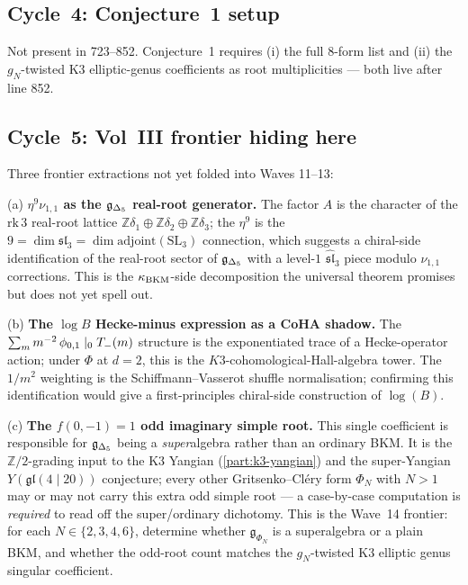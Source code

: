 \subsection*{Cycle~4: Conjecture~1 setup}

Not present in 723--852. Conjecture~1 requires (i) the full 8-form list
and (ii) the $g_N$-twisted K3 elliptic-genus coefficients as root
multiplicities --- both live after line 852.

\subsection*{Cycle~5: Vol~III frontier hiding here}

Three frontier extractions not yet folded into Waves 11--13:

(a) \textbf{$\eta^9 \nu_{1,1}$ as the $\mathfrak{g}_{\Delta_5}$ real-root generator.} The
factor $A$ is the character of the $\mathrm{rk}\,3$ real-root lattice
$\mathbb{Z}\delta_1 \oplus \mathbb{Z}\delta_2 \oplus \mathbb{Z}\delta_3$;
the $\eta^9$ is the $9 = \dim \mathfrak{sl}_3 = \dim \mathrm{adjoint}(\mathrm{SL}_3)$
connection, which suggests a chiral-side identification of the real-root
sector of $\mathfrak{g}_{\Delta_5}$ with a level-$1$ $\widehat{\mathfrak{sl}}_3$ piece modulo
$\nu_{1,1}$ corrections. This is the $\kappa_{\mathrm{BKM}}$-side decomposition the
universal theorem promises but does not yet spell out.

(b) \textbf{The $\log B$ Hecke-minus expression as a CoHA shadow.} The
$\sum_m m^{-2}\,\phi_{0,1} \mid_0 T_-(m)$ structure is the exponentiated
trace of a Hecke-operator action; under $\Phi$ at $d = 2$, this is the
$K3$-cohomological-Hall-algebra tower. The $1/m^2$ weighting is the
Schiffmann--Vasserot shuffle normalisation; confirming this
identification would give a first-principles chiral-side construction
of $\log(B)$.

(c) \textbf{The $f(0, -1) = 1$ odd imaginary simple root.} This single
coefficient is responsible for $\mathfrak{g}_{\Delta_5}$ being a \emph{super}algebra
rather than an ordinary BKM. It is the $\mathbb{Z}/2$-grading input to
the K3 Yangian (\ref{part:k3-yangian}) and the super-Yangian
$Y(\mathfrak{gl}(4 \mid 20))$ conjecture; every other Gritsenko--Cl\'ery form $\Phi_N$ with $N > 1$
may or may not carry this extra odd simple root --- a case-by-case
computation is \emph{required} to read off the super/ordinary
dichotomy. This is the Wave~14 frontier: for each $N \in \{2,3,4,6\}$,
determine whether $\mathfrak{g}_{\Phi_N}$ is a superalgebra or a
plain BKM, and whether the odd-root count matches the
$g_N$-twisted K3 elliptic genus singular coefficient.
